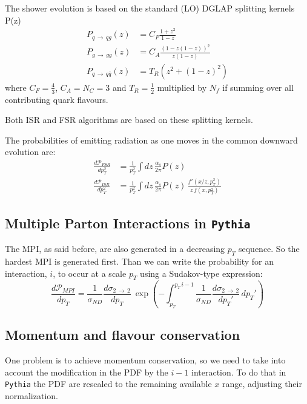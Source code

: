 The shower evolution is based on the standard (LO) DGLAP splitting kernels P(z)
\begin{align}
P_{q\,\rightarrow\,qg}(z) & = C_F\frac{1+z^2}{1-z} \\
P_{g\,\rightarrow\,gg}(z) & = C_A\frac{(1-z(1-z))^2}{z(1-z)} \\
P_{q\,\rightarrow\,q\overline{q}}(z) & = T_R(z^2+(1-z)^2)
\end{align} 
where $C_F=\frac{4}{3}$, $C_A=N_C=3$ and $T_R=\frac{1}{2}$ multiplied by $N_f$ if summing over all contributing quark flavours.

Both ISR and FSR algorithms are based on these splitting kernels.

The probabilities of emitting radiation as one moves in the common downward evolution are:
\begin{align}
	\frac{d\mathcal{P}_{FSR}}{dp_T^2} &= \frac{1}{p_T^2}\int dz\,\frac{\alpha_s}{2\pi}P(z)\\
	\frac{d\mathcal{P}_{ISR}}{dp_T^2} &= \frac{1}{p_T^2}\int dz\,\frac{\alpha_s}{2\pi}P(z)\,\frac{f'(x/z,p_T^2)}{z\,f(x,p_T^2)}
\end{align}

\subsection{Multiple Parton Interactions in \texttt{Pythia}}

The MPI, as said before, are also generated in a decreasing $p_T$ sequence. So the hardest MPI is generated first. Than we can write the probability for an interaction, $i$, to occur at a scale $p_T$ using a Sudakov-type expression:
\begin{equation}
	\frac{d\mathcal{P}_{MPI}}{dp_T}=\frac{1}{\sigma_{ND}}\frac{d\sigma_{2\,\rightarrow\,2}}{dp_T}\ \exp\left( -\displaystyle\int_{p_T}^{p_T\,i-1} \frac{1}{\sigma_{ND}}\frac{d\sigma_{2\,\rightarrow\,2}}{dp_T'}\,dp_T' \right)
\end{equation}

\subsection{Momentum and flavour conservation}

One problem is to achieve momentum conservation, so we need to take into account the modification in the PDF by the $i-1$ interaction. To do that in \texttt{Pythia} the PDF are rescaled to the remaining available $x$ range, adjusting their normalization.

